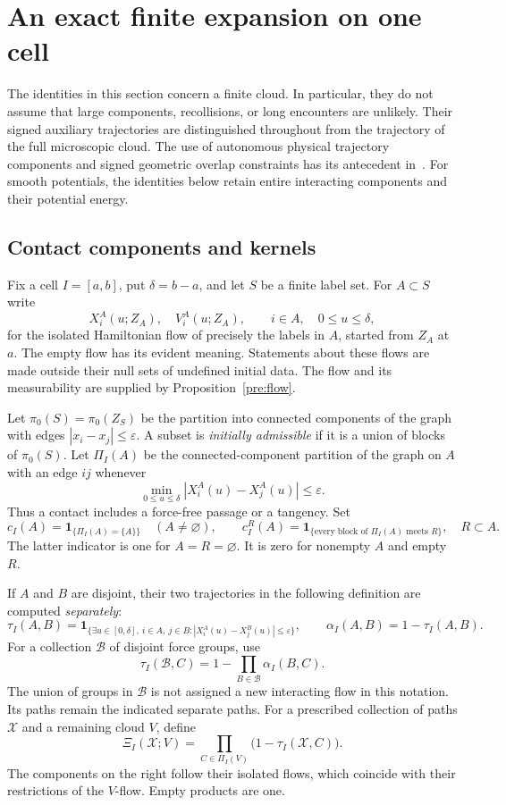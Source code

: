 \section{An exact finite expansion on one cell}
\label{sec:cell}
\label{sec:cell-expansion}

The identities in this section concern a finite cloud.  In particular, they
do not assume that large components, recollisions, or long encounters are
unlikely.  Their signed auxiliary trajectories are distinguished throughout
from the trajectory of the full microscopic cloud. The use of autonomous
physical trajectory components and signed geometric overlap constraints
has its antecedent in~\cite{BGSSCluster2022}. For smooth potentials,
the identities below retain entire interacting components and their
potential energy.

\subsection{Contact components and kernels}

Fix a cell $I=[a,b]$, put $\delta=b-a$, and let $S$ be a finite label set.
For $A\subset S$ write
\[
 X_i^A(u;Z_A),\quad V_i^A(u;Z_A),\qquad i\in A,\quad 0\leq u\leq\delta,
\]
for the isolated Hamiltonian flow of precisely the labels in $A$, started
from $Z_A$ at $a$.  The empty flow has its evident meaning.  Statements about
these flows are made outside their null sets of undefined initial data.
The flow and its measurability are supplied by Proposition~\ref{pre:flow}.

Let $\pi_0(S)=\pi_0(Z_S)$ be the partition into connected components of
the graph with edges $|x_i-x_j|\leq\varepsilon$.  A subset is
\emph{initially admissible} if it is a union of blocks of $\pi_0(S)$.
Let $\Pi_I(A)$ be the connected-component partition of the graph on $A$
with an edge $ij$ whenever
\[
 \min_{0\leq u\leq\delta}|X_i^A(u)-X_j^A(u)|\leq\varepsilon.
\]
Thus a contact includes a force-free passage or a tangency.  Set
\[
 c_I(A)=\mathbf 1_{\{\Pi_I(A)=\{A\}\}}\quad(A\ne\varnothing),
 \qquad
 c_I^R(A)=\mathbf 1_{\{\text{every block of }\Pi_I(A)\text{ meets }R\}},
 \quad R\subset A.
\]
The latter indicator is one for $A=R=\varnothing$.  It is zero for
nonempty $A$ and empty $R$.

If $A$ and $B$ are disjoint, their two trajectories in the following
definition are computed \emph{separately}:
\[
 \tau_I(A,B)=\mathbf 1_{\{\exists u\in[0,\delta],\ i\in A,\ j\in B:
             |X_i^A(u)-X_j^B(u)|\leq\varepsilon\}},
 \qquad \alpha_I(A,B)=1-\tau_I(A,B).
\]
For a collection $\mathcal B$ of disjoint force groups, use
\[
 \tau_I(\mathcal B,C)=1-\prod_{B\in\mathcal B}\alpha_I(B,C).
\]
The union of groups in $\mathcal B$ is not assigned a new interacting
flow in this notation.  Its paths remain the indicated separate paths.
For a prescribed collection of paths $\mathcal X$ and a remaining cloud
$V$, define
\begin{equation}
 \Xi_I(\mathcal X;V)
 =\prod_{C\in\Pi_I(V)}\bigl(1-\tau_I(\mathcal X,C)\bigr).
 \label{eq:cell-Xi}
\end{equation}
The components on the right follow their isolated flows, which coincide
with their restrictions of the $V$-flow.  Empty products are one.

